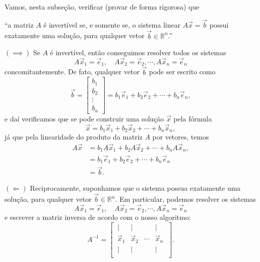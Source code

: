 Vamos, nesta subseção, verificar (provar de forma rigorosa) que
\begin{center}
  ``a matriz $A$ é invertível se, e somente se, o sistema linear $A \vec{x} = \vec{b}$ possui exatamente uma solução, para qualquer vetor $\vec{b} \in \mathbb{R}^n$.''
\end{center}

\noindent $(\!\implies\!\!)$ Se $A$ é invertível, então conseguimos resolver todos os sistemas
\begin{equation}
A \vec{x}_1 = \vec{e}_1, \quad A \vec{x}_2 = \vec{e}_2, \cdots, A \vec{x}_n = \vec{e}_n
\end{equation} concomitantemente. De fato, qualquer vetor $\vec{b}$ pode ser escrito como
\begin{equation}
\vec{b} =
\left[
\begin{array}{c}
b_1 \\
b_2 \\
\vdots \\
b_n 
\end{array}
\right] =
b_1 \vec{e}_1 + b_2 \vec{e}_2 + \cdots + b_n \vec{e}_n,
\end{equation} e daí verificamos que se pode construir uma solução $\vec{x}$ pela fórmula
\begin{equation}
\vec{x} = b_1 \vec{x}_1 + b_2 \vec{x}_2 + \cdots + b_n \vec{x}_n,
\end{equation} já que pela linearidade do produto da matriz $A$ por vetores, temos
\begin{align*}
A  \vec{x} & = b_1 A\vec{x}_1 + b_2 A\vec{x}_2 + \cdots + b_n A\vec{x}_n, \\
& = b_1 \vec{e}_1 + b_2 \vec{e}_2 + \cdots + b_n \vec{e}_n \\
& = \vec{b}.
\end{align*}

\noindent $(\!\Longleftarrow)$ Reciprocamente, suponhamos que o sistema possua exatamente uma solução, para qualquer vetor $\vec{b} \in \mathbb{R}^n$. Em particular, podemos resolver os sistemas
\begin{equation}
A \vec{x}_1 = \vec{e}_1, \quad A \vec{x}_2 = \vec{e}_2, \cdots, A \vec{x}_n = \vec{e}_n
\end{equation} e escrever a matriz inversa de acordo com o nosso algoritmo:
\begin{equation}
A^{-1} =
\begin{bmatrix}
\ |  &  |  &   & | \ \\
\ \vec{x}_1  &  \vec{x}_2 & \cdots & \vec{x}_n \ \\
\ |  &  |  &   & | \ \\
\end{bmatrix}.
\end{equation}

